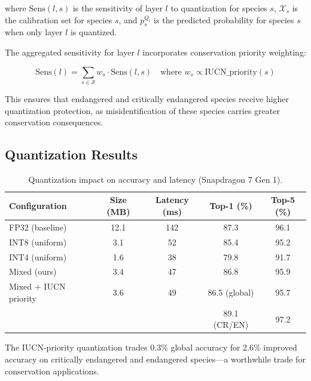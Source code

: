 \documentclass[11pt,a4paper]{article}
\begin{document}
\noindent where $\text{Sens}(l, s)$ is the sensitivity of layer $l$ to quantization for species $s$, $\mathcal{X}_s$ is the calibration set for species $s$, and $p_s^{Q_l}$ is the predicted probability for species $s$ when only layer $l$ is quantized.

The aggregated sensitivity for layer $l$ incorporates conservation priority weighting:

\begin{equation}
    \text{Sens}(l) = \sum_{s \in \mathcal{S}} w_s \cdot \text{Sens}(l, s) \quad \text{where } w_s \propto \text{IUCN\_priority}(s)
\end{equation}

This ensures that endangered and critically endangered species receive higher quantization protection, as misidentification of these species carries greater conservation consequences.

\subsection{Quantization Results}

\begin{table}[H]
\centering
\caption{Quantization impact on accuracy and latency (Snapdragon 7 Gen 1).}
\label{tab:quantization}
\begin{tabular}{@{}lcccc@{}}
\toprule
\textbf{Configuration} & \textbf{Size (MB)} & \textbf{Latency (ms)} & \textbf{Top-1 (\%)} & \textbf{Top-5 (\%)} \\
\midrule
FP32 (baseline) & 12.1 & 142 & 87.3 & 96.1 \\
INT8 (uniform) & 3.1 & 52 & 85.4 & 95.2 \\
INT4 (uniform) & 1.6 & 38 & 79.8 & 91.7 \\
Mixed (ours) & 3.4 & 47 & 86.8 & 95.9 \\
Mixed + IUCN priority & 3.6 & 49 & 86.5 (global) & 95.7 \\
 & & & 89.1 (CR/EN) & 97.2 \\
\bottomrule
\end{tabular}
\end{table}

The IUCN-priority quantization trades 0.3\% global accuracy for 2.6\% improved accuracy on critically endangered and endangered species---a worthwhile trade for conservation applications.

\end{document}
